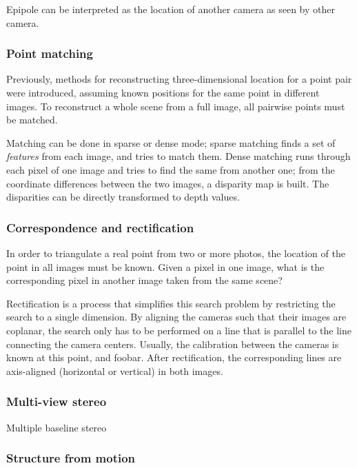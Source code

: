 Epipole can be interpreted as the location of another camera as seen by other camera.

\subsubsection{Point matching}

Previously, methods for reconstructing three-dimensional location for a point pair were introduced, assuming known positions for the same point in different images.
To reconstruct a whole scene from a full image, all pairwise points must be matched.

Matching can be done in sparse or dense mode; sparse matching finds a set of \textit{features} from each image, and tries to match them. Dense matching runs through each pixel of one image and tries to find the same from another one; from the coordinate differences between the two images, a disparity map is built. The disparities can be directly transformed to depth values.


\subsubsection{Correspondence and rectification}

In order to triangulate a real point from two or more photos, the location of the point in all images must be known.
Given a pixel in one image, what is the corresponding pixel in another image taken from the same scene?

Rectification is a process that simplifies this search problem by restricting the search to a single dimension.
By aligning the cameras such that their images are coplanar, the search only has to be performed on a line that is parallel to the line connecting the camera centers.
Usually, the calibration between the cameras is known at this point, and foobar.
After rectification, the corresponding lines are axis-aligned (horizontal or vertical) in both images.


\subsubsection{Multi-view stereo}

Multiple baseline stereo \cite{okutomi1993multiple}

\subsubsection{Structure from motion}

